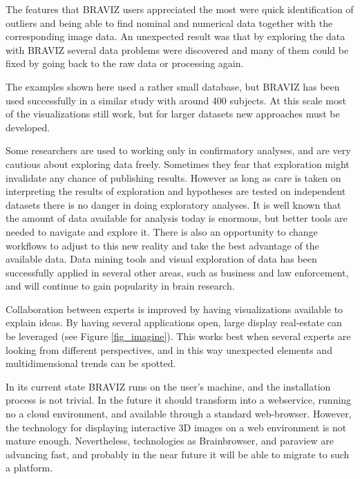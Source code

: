 \documentclass[utf8,paper]{frontiersSCNS} %
\begin{document}
The features that BRAVIZ users appreciated the most were quick identification of outliers and being able to find nominal and numerical data together with the corresponding image data. An unexpected result was that by exploring the data with BRAVIZ several data problems were discovered and many of them could be fixed by going back to the raw data or processing again. 

The examples shown here used a rather small database, but BRAVIZ has been used successfully in a similar study with around 400 subjects. At this scale most of the visualizations still work, but for larger datasets new approaches must be developed. 

Some researchers are used to working only in confirmatory analyses, and are very cautious about exploring data freely. Sometimes they fear that exploration might invalidate any chance of publishing results. However as long as care is taken on interpreting the results of exploration and hypotheses are tested on independent datasets there is no danger in doing exploratory analyses. It is well known that the amount of data available for analysis today is enormous, but better tools are needed to navigate and explore it. There is also an opportunity to change workflows to adjust to this new reality and take the best advantage of the available data. Data mining tools and visual exploration of data has been successfully applied in several other areas, such as business and law enforcement, and will continue to gain popularity in brain research. 

Collaboration between experts is improved by having visualizations available to explain ideas. By having several applications open, large display real-estate can be leveraged (see Figure \ref{fig_imagine}). This works best when several experts are looking from different perspectives, and in this way unexpected elements and multidimensional trends can be spotted.


In its current state BRAVIZ runs on the user's machine, and the installation process is not trivial. In the future it should transform into a webservice, running no a cloud environment, and available through a standard web-browser. However, the technology for displaying interactive 3D images on a web environment is not mature enough. Nevertheless, technologies as Brainbrowser\citep{sherif_brainbrowser:_2014}, and paraview\citep{ahrens_36_2005} are advancing fast, and probably in the near future it will be able to migrate to such a platform. 
\end{document}
